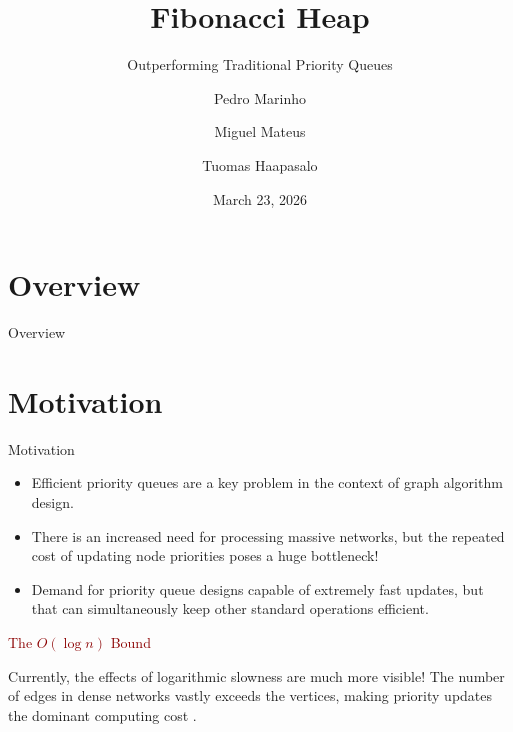 \documentclass{beamer}
\title{Fibonacci Heap}
\subtitle{Outperforming Traditional Priority Queues}
\author{Pedro Marinho \and Miguel Mateus \and Tuomas Haapasalo}
\institute{FEUP}
\date{March 23, 2026}
\begin{document}
\begin{frame}
  \titlepage
\end{frame}

\section{Overview}
\begin{frame}{Overview}
  \tableofcontents[sections={2-8}]
\end{frame}


\section{Motivation}

\begin{frame}{Motivation}
  \begin{itemize}
    \item Efficient priority queues are a key problem in the context of graph algorithm design.
    \item There is an increased need for processing massive networks, but the repeated cost of updating node priorities poses a huge bottleneck!
    \item Demand for priority queue designs capable of extremely fast updates, but that can simultaneously keep other standard operations efficient.
  \end{itemize}
  
  \vspace{0.2cm}
  {\large \textcolor{darkred}{The $O(\log n)$ Bound}}
  
  \vspace{0.1cm}
  Currently, the effects of logarithmic slowness are much more visible! The number of edges in dense networks vastly exceeds the vertices, making priority updates the dominant computing cost \cite{fredman1987}.
\end{frame}
\end{document}
